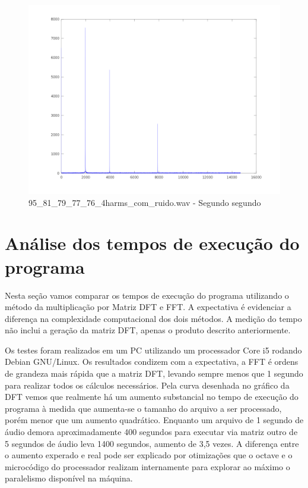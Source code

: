 \documentclass[brazil,times]{abnt}
\begin{document}
			\begin{figure}[h!]
			\begin{center}
			  \includegraphics[width=150mm]{imagens/95_81_79_77_76_4harms_com_ruido_freq_seg_2.png}
			  \caption[95\_81\_79\_77\_76\_4harms\_com\_ruido.wav - Segundo segundo]{95\_81\_79\_77\_76\_4harms\_com\_ruido.wav - Segundo segundo}
			\end{center}
			\end{figure}

\chapter{Análise dos tempos de execução do programa}
Nesta seção vamos comparar os tempos de execução do programa utilizando o método da multiplicação por Matriz DFT e FFT. A expectativa é evidenciar a diferença na complexidade computacional dos dois métodos. A medição do tempo não inclui a geração da matriz DFT, apenas o produto descrito anteriormente. 

Os testes foram realizados em um PC utilizando um processador Core i5 rodando Debian GNU/Linux. Os resultados condizem com a expectativa, a FFT é ordens de grandeza mais rápida que a matriz DFT, levando sempre menos que 1 segundo para realizar todos os cálculos necessários. Pela curva desenhada no gráfico da DFT vemos que realmente há um aumento substancial no tempo de execução do programa à medida que aumenta-se o tamanho do arquivo a ser processado, porém menor que um aumento quadrático. Enquanto um arquivo de 1 segundo de áudio demora aproximadamente 400 segundos para executar via matriz outro de 5 segundos de áudio leva 1400 segundos, aumento de 3,5 vezes. A diferença entre o aumento experado e real pode ser explicado por otimizações que o octave e o microcódigo do processador realizam internamente para explorar ao máximo o paralelismo disponível na máquina.
\end{document}
